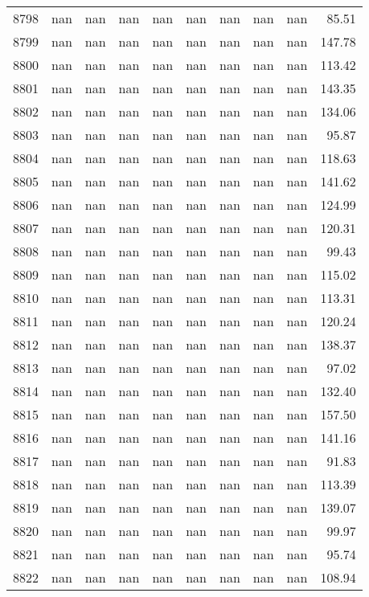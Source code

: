 \begin{tabular}{lrrrrrrrrr}
8798 & nan & nan & nan & nan & nan & nan & nan & nan & 85.51 \\
8799 & nan & nan & nan & nan & nan & nan & nan & nan & 147.78 \\
8800 & nan & nan & nan & nan & nan & nan & nan & nan & 113.42 \\
8801 & nan & nan & nan & nan & nan & nan & nan & nan & 143.35 \\
8802 & nan & nan & nan & nan & nan & nan & nan & nan & 134.06 \\
8803 & nan & nan & nan & nan & nan & nan & nan & nan & 95.87 \\
8804 & nan & nan & nan & nan & nan & nan & nan & nan & 118.63 \\
8805 & nan & nan & nan & nan & nan & nan & nan & nan & 141.62 \\
8806 & nan & nan & nan & nan & nan & nan & nan & nan & 124.99 \\
8807 & nan & nan & nan & nan & nan & nan & nan & nan & 120.31 \\
8808 & nan & nan & nan & nan & nan & nan & nan & nan & 99.43 \\
8809 & nan & nan & nan & nan & nan & nan & nan & nan & 115.02 \\
8810 & nan & nan & nan & nan & nan & nan & nan & nan & 113.31 \\
8811 & nan & nan & nan & nan & nan & nan & nan & nan & 120.24 \\
8812 & nan & nan & nan & nan & nan & nan & nan & nan & 138.37 \\
8813 & nan & nan & nan & nan & nan & nan & nan & nan & 97.02 \\
8814 & nan & nan & nan & nan & nan & nan & nan & nan & 132.40 \\
8815 & nan & nan & nan & nan & nan & nan & nan & nan & 157.50 \\
8816 & nan & nan & nan & nan & nan & nan & nan & nan & 141.16 \\
8817 & nan & nan & nan & nan & nan & nan & nan & nan & 91.83 \\
8818 & nan & nan & nan & nan & nan & nan & nan & nan & 113.39 \\
8819 & nan & nan & nan & nan & nan & nan & nan & nan & 139.07 \\
8820 & nan & nan & nan & nan & nan & nan & nan & nan & 99.97 \\
8821 & nan & nan & nan & nan & nan & nan & nan & nan & 95.74 \\
8822 & nan & nan & nan & nan & nan & nan & nan & nan & 108.94 \\

\end{tabular}
